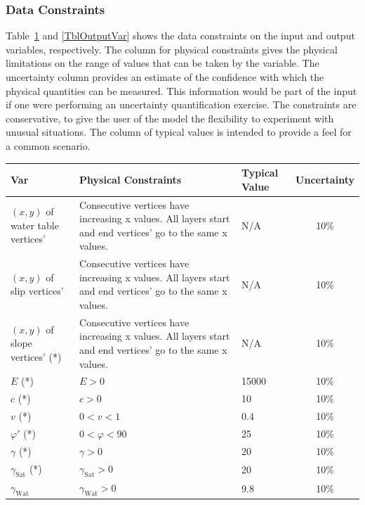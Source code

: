 \documentclass[12pt]{article}
\renewcommand{\arraystretch}{1}
\begin{document}

\subsubsection{Data Constraints} \label{sec_DataConstraints}    

Table~\ref{TblInputVar} and \ref{TblOutputVar} shows the data constraints on the input and output variables, respectively. The column for physical constraints gives the physical limitations on the range of values that can be taken by the variable. The uncertainty column provides an estimate of the confidence with which the physical quantities can be measured. This information would be part of the input if one were performing an uncertainty quantification exercise. The constraints are conservative, to give the user of the model the flexibility to experiment with unusual situations. The column of typical values is intended to provide a feel for a common scenario.

\newpage

\renewcommand{\arraystretch}{1.5}
\noindent \begin{longtable}{p{2.4cm} p{5.8cm} p{1.2cm} c}
  \toprule  \label{TblInputVar}
  \textbf{Var} & \textbf{Physical Constraints} & \textbf{Typical
    Value} & \textbf{Uncertainty}\\ \midrule
  $(x,y)$ of water table vertices' & Consecutive vertices have
  increasing x values. All layers start and end vertices' go to the
  same x values. & N/A & 10\% \\
  $(x,y)$ of slip vertices' & Consecutive vertices have increasing x
  values. All layers start and end vertices' go to the same x
  values. & N/A & 10\% \\
  $(x,y)$ of slope vertices' (*) & Consecutive vertices have
  increasing x values. All layers start and end vertices' go to the
  same x values. & N/A & 10\% \\
  $E$ (*) & $E > 0$ & 15000 & 10\%\\
  $c$ (*) & $c >0$ & 10 & 10\%\\
  $v$ (*) & $ 0 < v < 1 $ & 0.4 & 10\%\\
  $\varphi'$ (*) & $ 0 < \varphi < 90 $ & 25 & 10\% \\
  $\gamma$ (*) & $\gamma > 0$ & 20 & 10\% \\
  $\gamma_{\text{Sat}}$ (*) & $\gamma_{\text{Sat}} > 0 $ & 20 & 10\%
  \\
  $\gamma_{\text{Wat}}$ & $\gamma_{\text{Wat}} > 0 $ & 9.8 & 10\% \\
  \bottomrule
\end{longtable}
\end{document}
